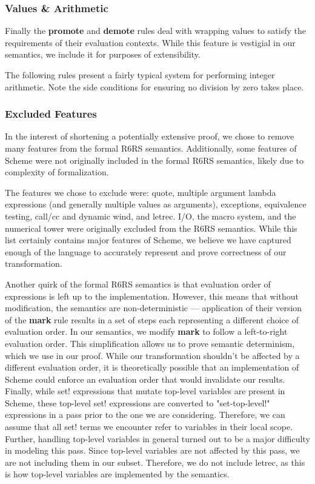 \subsubsection{Values \& Arithmetic}\label{sxn:sem_vals_math}
Finally the \textbf{promote} and \textbf{demote} rules deal with wrapping values to satisfy the requirements of their evaluation contexts. While this feature is vestigial in our semantics, we include it for purposes of extensibility.

The following rules present a fairly typical system for performing integer arithmetic. Note the side conditions for ensuring no division by zero takes place.

\subsubsection{Excluded Features\label{sxn:excluded}}
In the interest of shortening a potentially extensive proof, we chose to remove many features from the formal R6RS semantics. Additionally, some features of Scheme were not originally included in the formal R6RS semantics, likely due to complexity of formalization.

The features we chose to exclude were: quote, multiple argument lambda expressions (and generally multiple values as arguments), exceptions, equivalence testing, call/cc and dynamic wind, and letrec. I/O, the macro system, and the numerical tower were originally excluded from the R6RS semantics. While this list certainly contains major features of Scheme, we believe we have captured enough of the language to accurately represent and prove correctness of our transformation.

Another quirk of the formal R6RS semantics is that evaluation order of expressions is left up to the implementation. However, this means that without modification, the semantics are non-deterministic --- application of their version of the \textbf{mark} rule results in a set of steps each representing a different choice of evaluation order. In our semantics, we modify \textbf{mark} to follow a left-to-right evaluation order. This simplification allows us to prove semantic determinism, which we use in our proof. While our transformation shouldn't be affected by a different evaluation order, it is theoretically possible that an implementation of Scheme could enforce an evaluation order that would invalidate our results. 
Finally, while set! expressions that mutate top-level variables are present in Scheme, these top-level set! expressions are converted to "set-top-level!" expressions in a pass prior to the one we are considering. Therefore, we can assume that all set! terms we encounter refer to variables in their local scope. Further, handling top-level variables in general turned out to be a major difficulty in modeling this pass. Since top-level variables are not affected by this pass, we are not including them in our subset. Therefore, we do not include letrec, as this is how top-level variables are implemented by the semantics.
